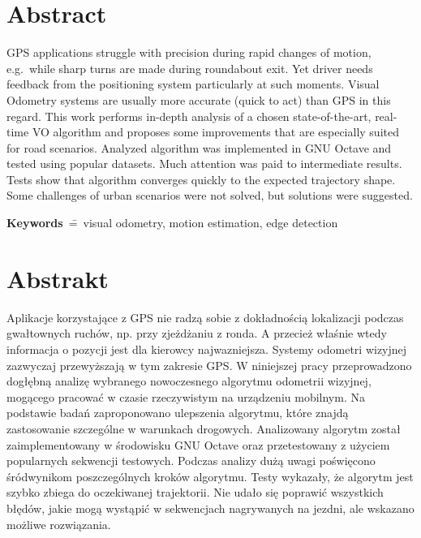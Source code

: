 
\section*{Abstract}


GPS applications struggle with precision during rapid changes of motion, e.g.~while sharp turns are made during roundabout exit. Yet driver needs feedback from the positioning system particularly at such moments.
Visual Odometry systems are usually more accurate (quick to act) than GPS in this regard.
This work performs in-depth analysis of a chosen state-of-the-art, real-time VO algorithm and proposes some improvements that are especially suited for road scenarios.
Analyzed algorithm was implemented in GNU Octave and tested using popular datasets. Much attention was paid to intermediate results.
Tests show that algorithm converges quickly to the expected trajectory shape. Some challenges of urban scenarios were not solved, but solutions were suggested.

\textbf{Keywords}~\==~visual odometry, motion estimation, edge detection

\section*{Abstrakt}

Aplikacje korzystające z GPS nie radzą sobie z dokładno\'scią lokalizacji podczas gwałtownych ruchów, np. przy zjeżdżaniu z ronda. A przecież wła\'snie wtedy informacja o pozycji jest dla kierowcy najwazniejsza.
Systemy odometri wizyjnej zazwyczaj przewyższają w tym zakresie GPS.
W niniejszej pracy przeprowadzono dogłębną analizę wybranego nowoczesnego algorytmu odometrii wizyjnej, mogącego pracować w czasie rzeczywistym na urządzeniu mobilnym. Na podstawie badań zaproponowano ulepszenia algorytmu, które znajdą zastosowanie szczególne w warunkach drogowych.
Analizowany algorytm został zaimplementowany w \'srodowisku GNU Octave oraz przetestowany z użyciem popularnych sekwencji testowych. Podczas analizy dużą uwagi po\'swięcono \'sródwynikom poszczególnych kroków algorytmu.
Testy wykazały, że algorytm jest szybko zbiega do oczekiwanej trajektorii. Nie udało się poprawić wszystkich błędów, jakie mogą wystąpić w sekwencjach nagrywanych na jezdni, ale wskazano możliwe rozwiązania.

